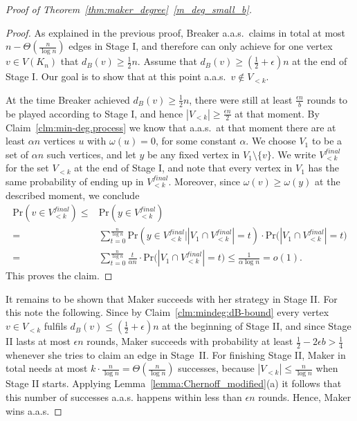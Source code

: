 \documentclass[11pt, a4paper]{article}
\numberwithin{equation}{section}
\numberwithin{figure}{section}
\begin{document}
\begin{proof}[Proof of Theorem~\ref{thm:maker_degree}~\ref{m_deg_small_b}]
\begin{proof}
	As explained in the previous proof, Breaker a.a.s.~claims 
	in total at most 
	$n - \Theta(\frac{n}{\log{n}})$ edges in Stage I, and 
	therefore can only achieve for one vertex $v \in V(K_n)$ 
	that $d_B(v) \geq \frac{1}{2}n$.
	Assume that $d_B(v) \geq (\frac{1}{2} + \epsilon)n$ at the 
	end of Stage I. Our goal is to show that at this point
	a.a.s.~$v\notin V_{<k}$.

	At the time Breaker achieved $d_B(v) \geq \frac{1}{2}n$, 
	there were still at least $\frac{\epsilon n}{b}$ rounds to 
	be played according to Stage I, 
	and hence $|V_{<k}|\geq \frac{\epsilon n}{2}$
	at that moment. By Claim~\ref{clm:min-deg.process}
	we know that a.a.s.~at that moment there are at least 
	$\alpha n$ vertices $u$ with $\omega(u)=0$, for some 
	constant $\alpha$. We choose $V_1$ to be a set of 
	$\alpha n$ such vertices, and let $y$ be any fixed vertex 
	in $V_1\setminus \{v\}$. We write $V_{<k}^{final}$ for the 
	set $V_{<k}$ at the end of Stage I, and note that every 
	vertex in $V_1$ has the same probability of ending up in
	$V_{<k}^{final}$. Moreover, since 
	$\omega(v)\geq \omega(y)$ at the described moment,
	we conclude
\begin{align*}
\text{Pr}(v\in V_{<k}^{final}) 
\leq
& \text{Pr}(y\in V_{<k}^{final}) \\
=
& \sum_{t=0}^{\frac{n}{\log n}}
\text{Pr}\left(y\in V_{<k}^{final} \Big| |V_1\cap V_{<k}^{final}|=t \right)
\cdot \text{Pr($|V_1\cap V_{<k}^{final}|=t$)} \\
=
& \sum_{t=0}^{\frac{n}{\log n}}
\frac{t}{\alpha n}
\cdot \text{Pr($|V_1\cap V_{<k}^{final}|=t$)} 
\leq \frac{1}{\alpha \log n} = o (1) .
\end{align*}
This proves the claim.
\end{proof}	

		It remains to be shown that Maker succeeds with her strategy in Stage II. For this note the following. Since by Claim~\ref{clm:mindeg:dB-bound}
    every vertex $v \in V_{<k}$ fulfils $d_B(v) \leq (\frac{1}{2} + \epsilon)n$ at the beginning of Stage II, and since Stage II lasts at most $\epsilon n$ rounds, Maker succeeds with probability at least $\frac{1}{2} - 2\epsilon b > \frac{1}{4}$ whenever she tries to claim an edge in Stage~II. 
For finishing Stage II, Maker in total needs at most 
$k\cdot \frac{n}{\log n} = \Theta(\frac{n}{\log n})$ successes, because $|V_{<k}|\leq \frac{n}{\log n}$ when Stage II starts. Applying Lemma~\ref{lemma:Chernoff_modified}(a) it follows that this number of successes a.a.s. happens within less than $\epsilon n$ rounds. Hence, Maker wins a.a.s.
\end{proof}
\end{document}
